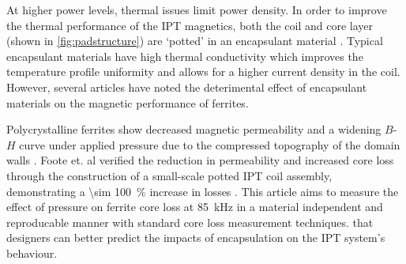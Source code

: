 \documentclass[conference]{IEEEtran}
\begin{document}
At higher power levels, thermal issues limit power density. 
In order to improve the thermal performance of the IPT magnetics, both the coil and core layer (shown in \cref{fig:padstructure}) are `potted' in an encapsulant material \cite{kneidlProcessingInfluencesResinbased2020}. 
Typical encapsulant materials have high thermal conductivity which improves the temperature profile uniformity and allows for a higher current density in the coil. 
However, several articles have noted the deterimental effect of encapsulant materials on the magnetic performance of ferrites. 

Polycrystalline ferrites show decreased magnetic permeability and a widening $B$-$H$ curve under applied pressure due to the compressed topography of the domain walls \cite{leflochEffectPressureSoft1981}. 
Foote et. al verified the reduction in permeability and increased core loss through the construction of a small-scale potted IPT coil assembly, demonstrating a \SI{\sim 100}{\percent} increase in losses \cite{footeEncapsulationResidualStress2023}.
This article aims to measure the effect of pressure on ferrite core loss at \SI{85}{\kilo\hertz} in a material independent and reproducable manner with standard core loss measurement techniques. that designers can better predict the impacts of encapsulation on the IPT system's behaviour. 
\end{document}
